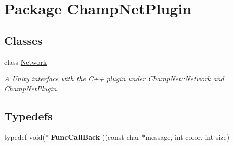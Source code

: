 \hypertarget{namespace_champ_net_plugin}{\section{Package Champ\-Net\-Plugin}
\label{namespace_champ_net_plugin}
}
\subsection*{Classes}
\begin{DoxyCompactItemize}
\item 
class \hyperlink{class_champ_net_plugin_1_1_network}{Network}
\begin{DoxyCompactList}\small\item\em A Unity interface with the C++ plugin under \hyperlink{class_champ_net_1_1_network}{Champ\-Net\-::\-Network} and \hyperlink{namespace_champ_net_plugin}{Champ\-Net\-Plugin}. \end{DoxyCompactList}\end{DoxyCompactItemize}
\subsection*{Typedefs}
\begin{DoxyCompactItemize}
\item 
\hypertarget{namespace_champ_net_plugin_a95f023a4e052d535ba21ff3bbb13b24c}{typedef void($\ast$ {\bfseries Func\-Call\-Back} )(const char $\ast$message, int color, int size)}\label{namespace_champ_net_plugin_a95f023a4e052d535ba21ff3bbb13b24c}

\end{DoxyCompactItemize}
